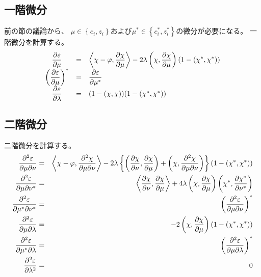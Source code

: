\documentclass[a4paper]{jsarticle}
\def\braces#1{\left( #1 \right)}
\def\bracem#1{\left\{ #1 \right\}}
\begin{document}
\subsection{一階微分}
前の節の議論から、
$\mu \in \bracem{c_i, z_i}$および$\mu^* \in \bracem{c_i^*, z_i^*}$の微分が必要になる。
一階微分を計算する。
\begin{eqnarray}
  \begin{array}{ccl}
    \displaystyle \frac{\partial \varepsilon}{\partial \mu} &=&
    \displaystyle \Braket{\chi-\varphi, \frac{\partial \chi}{\partial \mu }} -2\lambda \braces{\chi, \frac{\partial \chi}{\partial \mu}}(1-\braces{\chi^*, \chi^*})   \\
    \displaystyle \braces{\frac{\partial \varepsilon}{\partial \mu}}^* &=& \displaystyle \frac{\partial \varepsilon}{\partial \mu^*} \\
    \displaystyle \frac{\partial \varepsilon}{\partial \lambda} &=& (1-\braces{\chi, \chi})(1-\braces{\chi^*, \chi^*})
  \end{array}
\end{eqnarray}

\subsection{二階微分}
二階微分を計算する。
\begin{eqnarray}
  \frac{\partial^2 \varepsilon}{\partial \mu \partial \nu} &=&
  \Braket{\chi-\varphi, \frac{\partial^2 \chi}{\partial \mu \partial \nu}}
  -2\lambda \bracem{
    \braces{\frac{\partial \chi}{\partial \nu}, \frac{\partial \chi}{\partial \mu}} +
    \braces{\chi, \frac{\partial^2 \chi}{\partial \mu \partial \nu}} } (1-\braces{\chi^*, \chi^*}) \\ 
  \frac{\partial^2 \varepsilon}{\partial \mu \partial \nu^*} &=&
  \Braket{\frac{\partial \chi}{\partial \nu}, \frac{\partial \chi}{\partial \mu }}
  +4\lambda \braces{\chi, \frac{\partial \chi}{\partial \mu}}
  \braces{\chi^*, \frac{\partial \chi^*}{\partial \nu^*}} \\
  \frac{\partial^2 \varepsilon}{\partial \mu^* \partial \nu^*} &=&
  \braces{\frac{\partial^2 \varepsilon}{\partial \mu \partial \nu}}^* \\
  \frac{\partial^2 \varepsilon}{\partial \mu \partial \lambda} &=&
  -2\braces{\chi, \frac{\partial \chi}{\partial \mu}}(1-\braces{\chi^*, \chi^*}) \\
  \frac{\partial^2 \varepsilon}{\partial \mu^* \partial \lambda} &=&
  \braces{\frac{\partial^2 \varepsilon}{\partial \mu \partial \lambda}}^* \\
  \frac{\partial^2 \varepsilon}{\partial \lambda^2} &=& 0
\end{eqnarray}
\end{document}
